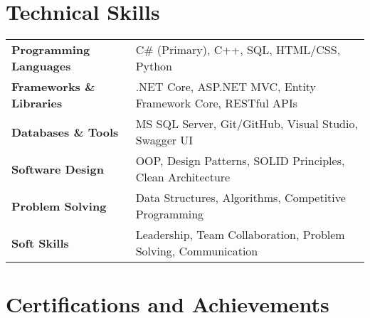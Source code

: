 \documentclass[letterpaper,11pt]{article}
\begin{document}
\section{\LARGE Technical Skills}
\vspace{7pt}
\renewcommand{\arraystretch}{1.3}
 \begin{tabular}{>{\raggedleft\arraybackslash}m{3.5cm} p{13cm}}
\large{\textbf{Programming Languages}}  & \hspace{8px}  C\# (Primary), C++, SQL, HTML/CSS, Python \\
\large{\textbf{Frameworks \& Libraries}} & \hspace{8px} .NET Core, ASP.NET MVC, Entity Framework Core, RESTful APIs \\
\large{\textbf{Databases \& Tools}} & \hspace{8px} MS SQL Server, Git/GitHub, Visual Studio, Swagger UI \\
\large{\textbf{Software Design}} & \hspace{8px} OOP, Design Patterns, SOLID Principles, Clean Architecture \\
\large{\textbf{Problem Solving}} & \hspace{8px} Data Structures, Algorithms, Competitive Programming \\
\large{\textbf{Soft Skills}} & \hspace{8px} Leadership, Team Collaboration, Problem Solving, Communication \\
\end{tabular}
 
\vspace{-5pt}
\section{\LARGE Certifications and Achievements}
\vspace{10pt}
\end{document}
